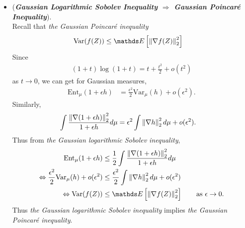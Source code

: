 \documentclass[11pt]{article}
\begin{document}
\begin{itemize}
\item \begin{remark} (\textbf{\emph{Gaussian Logarithmic Sobolev Inequality $\Rightarrow$  Gaussian Poincar{\'e} Inequality}}). \citep{boucheron2013concentration}\\
Recall that \emph{the Gaussian Poincar{\'e} inequality}
\begin{align*}
\text{Var}(f(Z)) &\le \E{}{\norm{\nabla f(Z)}{2}^2}
\end{align*} Since
\begin{align*}
(1+t)\log(1+t) = t + \frac{t^2}{2} + o(t^2)
\end{align*} as $t\to 0$, we can get for Gaussian measures,
\begin{align*}
\text{Ent}_{\mu}(1+\epsilon h) &= \frac{\epsilon^2}{2}\text{Var}_{\mu}(h) + o(\epsilon^2).
\end{align*}
Similarly, 
\begin{align*}
\int \frac{\left\|\nabla(1+\epsilon h)\right\|_{2}^2}{1+\epsilon h} d\mu &= \epsilon^2 \int \left\|\nabla h\right\|_{2}^2 d\mu  + o(\epsilon^2).
\end{align*}
Thus from \emph{the Gaussian logarithmic Sobolev inequality},
\begin{align*}
\text{Ent}_{\mu}(1+\epsilon h) &\le \frac{1}{2}\int \frac{\norm{\nabla(1+\epsilon h)}{2}^2}{1+\epsilon h} d\mu  \\
\Leftrightarrow \frac{\epsilon^2}{2}\text{Var}_{\mu}(h) + o(\epsilon^2) &\le \frac{\epsilon^2}{2} \int \norm{\nabla h}{2}^2 d\mu  + o(\epsilon^2)\\
\Leftrightarrow \text{Var}(f(Z)) &\le \E{}{\norm{\nabla f(Z)}{2}^2} \qquad \text{as } \epsilon \to 0.
\end{align*} Thus \emph{the Gaussian logarithmic Sobolev inequality} implies \emph{the Gaussian Poincar{\'e} inequality}.
\end{remark}
\end{itemize}
\end{document}
